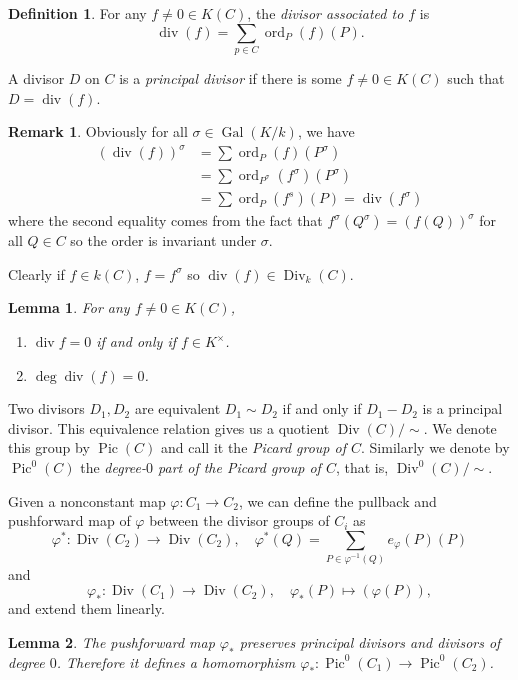\documentclass[12pt]{article}
\newtheorem{lemma}{Lemma}[subsection]
\theoremstyle{remark}
\theoremstyle{definition}
\newtheorem{remark}{Remark}[subsection]
\newtheorem{definition}{Definition}[subsection]
\newcommand{\ord}[0]{\operatorname{ord}}
\newcommand{\s}[0]{\sigma}
\newcommand{\Gal}[0]{\operatorname{Gal}}
\newcommand{\Div}[0]{\operatorname{Div}}
\newcommand{\pdiv}[0]{\operatorname{div}}
\newcommand{\Pic}[0]{\operatorname{Pic}}
\begin{document}
            \begin{definition}
                For any $f\neq 0\in K(C)$, the \textit{divisor associated to $f$} is
                \[\pdiv(f)=\sum_{p\in C}\ord_P(f)(P).\]
                
                A divisor $D$ on $C$ is a \textit{principal divisor} if there is some $f\neq 0\in K(C)$ such that $D=\pdiv(f)$.
            \end{definition}
            \begin{remark}
                Obviously for all $\s\in\Gal(K/k)$, we have
                \begin{align*}
                    (\pdiv(f))^\s&=\sum \ord_P(f)(P^\s)\\
                    &=\sum\ord_{P^\s}(f^\s)(P^\s)\\
                    &=\sum \ord_P(f^s)(P)=\pdiv(f^\s)
                \end{align*}
                where the second equality comes from the fact that $f^\s(Q^\s)=(f(Q))^\s$ for all $Q\in C$ so the order is invariant under $\s$.
                
                Clearly if $f\in k(C)$, $f=f^\s$ so $\pdiv(f)\in\Div_k(C)$.
            \end{remark}
            \begin{lemma}\label{lemma-deg-div}
                For any $f\neq 0\in K(C)$,
                \begin{enumerate}[\normalfont(i)]
                    \item $\pdiv f=0$ if and only if $f\in K^\times$.
                    \item $\deg\pdiv(f)=0$.
                \end{enumerate}
            \end{lemma}
            Two divisors $D_1, D_2$ are equivalent $D_1\sim D_2$ if and only if $D_1-D_2$ is a principal divisor. This equivalence relation gives us a quotient $\Div(C)/\sim$. We denote this group by $\Pic(C)$ and call it the \textit{Picard group of $C$}. Similarly we denote by $\Pic^0(C)$ the \textit{degree-$0$ part of the Picard group of $C$}, that is, $\Div^0(C)/\sim$.
            
            Given a nonconstant map $\varphi:C_1\to C_2$, we can define the pullback and pushforward map of $\varphi$ between the divisor groups of $C_i$ as
            \[\varphi^*:\Div(C_2)\to\Div(C_2),\quad\varphi^*(Q)=\sum_{P\in\varphi^{-1}(Q)}e_\varphi(P)(P)\]
            and
            \[\varphi_*:\Div(C_1)\to\Div(C_2),\quad\varphi_*(P)\mapsto (\varphi(P)),\]
            and extend them linearly.
            \begin{lemma}\label{lemma-pushforward-hom}
                The pushforward map $\varphi_*$ preserves principal divisors and divisors of degree $0$. Therefore it defines a homomorphism $\varphi_*:\Pic^0(C_1)\to\Pic^0(C_2)$.
            \end{lemma}
            
\end{document}
